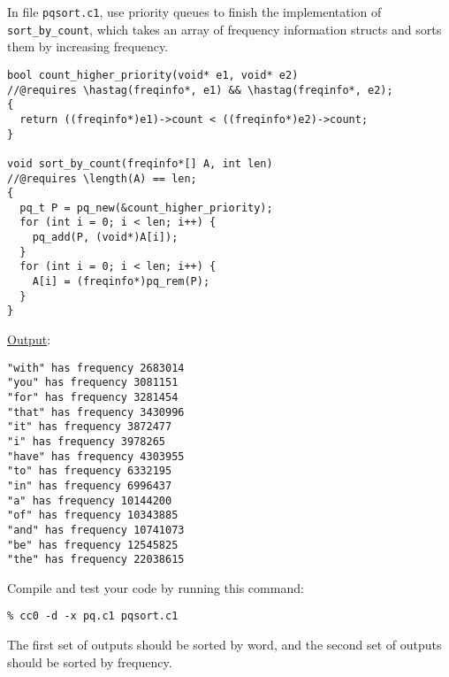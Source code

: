 \begin{part}
  In file \lstinline'pqsort.c1', use priority queues to finish the
  implementation of \lstinline'sort_by_count', which takes an array of
  frequency information structs and sorts them by increasing frequency.

  \begin{solution}
\begin{lstlisting}
bool count_higher_priority(void* e1, void* e2)
//@requires \hastag(freqinfo*, e1) && \hastag(freqinfo*, e2);
{
  return ((freqinfo*)e1)->count < ((freqinfo*)e2)->count;
}

void sort_by_count(freqinfo*[] A, int len)
//@requires \length(A) == len;
{
  pq_t P = pq_new(&count_higher_priority);
  for (int i = 0; i < len; i++) {
    pq_add(P, (void*)A[i]);
  }
  for (int i = 0; i < len; i++) {
    A[i] = (freqinfo*)pq_rem(P);
  }
}
	\end{lstlisting}
	\underline{Output}:
	\begin{lstlisting}
"with" has frequency 2683014
"you" has frequency 3081151
"for" has frequency 3281454
"that" has frequency 3430996
"it" has frequency 3872477
"i" has frequency 3978265
"have" has frequency 4303955
"to" has frequency 6332195
"in" has frequency 6996437
"a" has frequency 10144200
"of" has frequency 10343885
"and" has frequency 10741073
"be" has frequency 12545825
"the" has frequency 22038615
	\end{lstlisting}
  \end{solution}
\end{part}

Compile and test your code by running this command:

\lstinline[language={[coin]C}]'%

The first set of outputs should be sorted by word, and the second set of
outputs should be sorted by frequency.

\twoPT